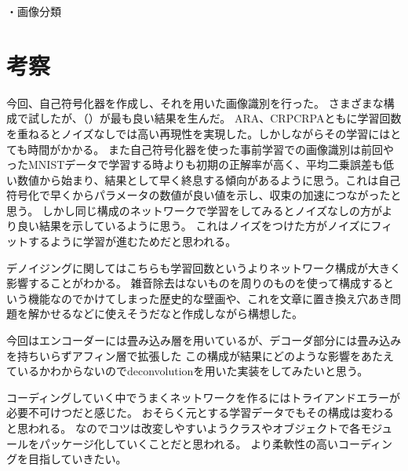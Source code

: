 \documentclass[12pt]{jsarticle}
\begin{document}
・画像分類




\section{考察}

今回、自己符号化器を作成し、それを用いた画像識別を行った。
さまざまな構成で試したが、（）が最も良い結果を生んだ。
ARA、CRPCRPAともに学習回数を重ねるとノイズなしでは高い再現性を実現した。しかしながらその学習にはとても時間がかかる。
また自己符号化器を使った事前学習での画像識別は前回やったMNISTデータで学習する時よりも初期の正解率が高く、平均二乗誤差も低い数値から始まり、結果として早く終息する傾向があるように思う。これは自己符号化で早くからパラメータの数値が良い値を示し、収束の加速につながったと思う。
しかし同じ構成のネットワークで学習をしてみるとノイズなしの方がより良い結果を示しているように思う。
これはノイズをつけた方がノイズにフィットするように学習が進むためだと思われる。

デノイジングに関してはこちらも学習回数というよりネットワーク構成が大きく影響することがわかる。
雑音除去はないものを周りのものを使って構成するという機能なのでかけてしまった歴史的な壁画や、これを文章に置き換え穴あき問題を解かせるなどに使えそうだなと作成しながら構想した。

今回はエンコーダーには畳み込み層を用いているが、デコーダ部分には畳み込みを持ちいらずアフィン層で拡張した
この構成が結果にどのような影響をあたえているかわからないのでdeconvolutionを用いた実装をしてみたいと思う。

コーディングしていく中でうまくネットワークを作るにはトライアンドエラーが必要不可けつだと感じた。
おそらく元とする学習データでもその構成は変わると思われる。
なのでコツは改変しやすいようクラスやオブジェクトで各モジュールをパッケージ化していくことだと思われる。
より柔軟性の高いコーディングを目指していきたい。




\clearpage
\end{document}
